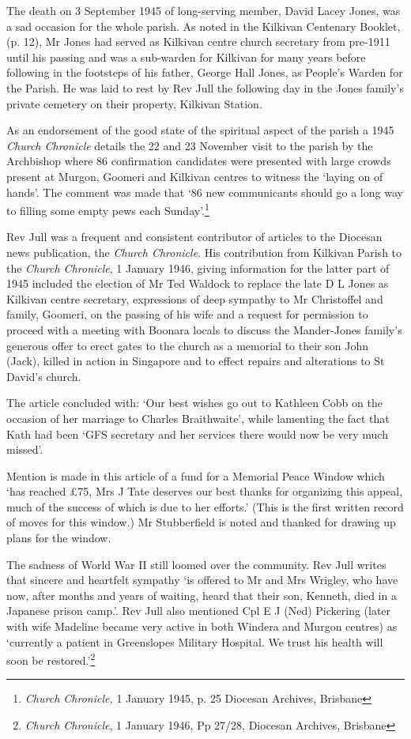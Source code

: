 The death on 3 September 1945 of long-serving member, David Lacey Jones, was a sad occasion for the whole parish. As noted in the Kilkivan Centenary Booklet, (p. 12), Mr Jones had served as Kilkivan centre church secretary from pre-1911 until his passing and was a sub-warden for Kilkivan for many years before following in the footsteps of his father, George Hall Jones, as People's Warden for the Parish. He was laid to rest by Rev Jull the following day in the Jones family's private cemetery on their property, Kilkivan Station.

As an endorsement of the good state of the spiritual aspect of the parish a 1945 \emph{Church Chronicle} details the 22 and 23 November visit to the parish by the Archbishop where 86 confirmation candidates were presented with large crowds present at Murgon, Goomeri and Kilkivan centres to witness the `laying on of hands'. The comment was made that `86 new communicants should go a long way to filling some empty pews each Sunday'.\footnote{\emph{Church Chronicle,} 1 January 1945, p. 25 Diocesan Archives, Brisbane}

Rev Jull was a frequent and consistent contributor of articles to the Diocesan news publication, the \emph{Church Chronicle}. His contribution from Kilkivan Parish to the \emph{Church Chronicle}, 1 January 1946, giving information for the latter part of 1945 included the election of Mr Ted Waldock to replace the late D L Jones as Kilkivan centre secretary, expressions of deep sympathy to Mr Christoffel and family, Goomeri, on the passing of his wife and a request for permission to proceed with a meeting with Boonara locals to discuss the Mander-Jones family's generous offer to erect gates to the church as a memorial to their son John (Jack), killed in action in Singapore and to effect repairs and alterations to St David's church.

The article concluded with: `Our best wishes go out to Kathleen Cobb on the occasion of her marriage to Charles Braithwaite', while lamenting the fact that Kath had been `GFS secretary and her services there would now be very much missed'.

Mention is made in this article of a fund for a Memorial Peace Window which `has reached £75, Mrs J Tate deserves our best thanks for organizing this appeal, much of the success of which is due to her efforts.' (This is the first written record of moves for this window.) Mr Stubberfield is noted and thanked for drawing up plans for the window.

The sadness of World War II still loomed over the community. Rev Jull writes that sincere and heartfelt sympathy `is offered to Mr and Mrs Wrigley, who have now, after months and years of waiting, heard that their son, Kenneth, died in a Japanese prison camp.'. Rev Jull also mentioned Cpl E J (Ned) Pickering (later with wife Madeline became very active in both Windera and Murgon centres) as `currently a patient in Greenslopes Military Hospital. We trust his health will soon be restored.'\footnote{\emph{Church Chronicle}, 1 January 1946, Pp 27/28, Diocesan Archives, Brisbane}


